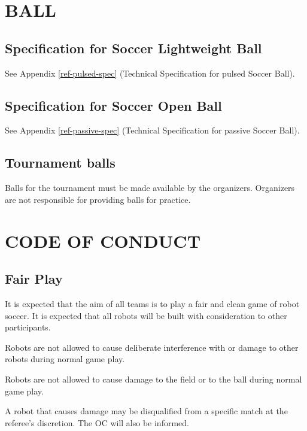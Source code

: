 \documentclass{article}
\begin{document}
\section{BALL \label{section:ball}}

\subsection{Specification for Soccer Lightweight Ball \label{ref-sec-spec-plused}}

See Appendix \ref{ref-pulsed-spec} (Technical Specification for pulsed Soccer
Ball).

\subsection{Specification for Soccer Open Ball\label{ref-sec-spec-open}}

See Appendix \ref{ref-passive-spec} (Technical Specification for passive Soccer
Ball).

\subsection{ Tournament balls \label{ref-tournament-balls}}

Balls for the tournament must be made available by the organizers. Organizers
are not responsible for providing balls for practice.

\section{CODE OF CONDUCT\label{ref-code-of-conduct}}

\subsection{ Fair Play \label{ref-041}}

It is expected that the aim of all teams is to play a fair and clean game of
robot soccer. It is expected that all robots will be built with consideration
to other participants.

Robots are not allowed to cause deliberate interference with or damage to other
robots during normal game play.

Robots are not allowed to cause damage to the field or to the ball during
normal game play.

A robot that causes damage may be disqualified from a specific
match at the referee's discretion. The OC will also be informed.
\end{document}
